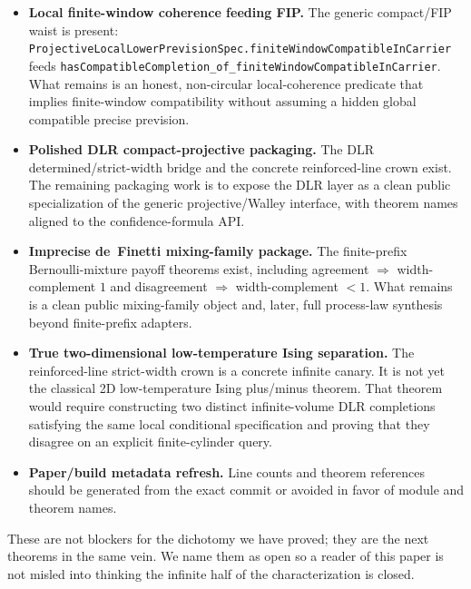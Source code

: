 \documentclass[]{article}
\newcommand{\lid}[1]{{\ttfamily\nolinkurl{#1}}}
\begin{document}
\begin{itemize}
\item \textbf{Local finite-window coherence feeding FIP.}
      The generic compact/FIP waist is present:
      \lid{ProjectiveLocalLowerPrevisionSpec.finiteWindowCompatibleInCarrier}
      feeds
      \lid{hasCompatibleCompletion\_of\_finiteWindowCompatibleInCarrier}.
      What remains is an honest, non-circular local-coherence predicate
      that implies finite-window compatibility without assuming a hidden
      global compatible precise prevision.

\item \textbf{Polished DLR compact-projective packaging.}
      The DLR determined/strict-width bridge and the concrete
      reinforced-line crown exist. The remaining packaging work is to
      expose the DLR layer as a clean public specialization of the generic
      projective/Walley interface, with theorem names aligned to the
      confidence-formula API.

\item \textbf{Imprecise de~Finetti mixing-family package.}
      The finite-prefix Bernoulli-mixture payoff theorems exist, including
      agreement $\Rightarrow$ width-complement $1$ and disagreement
      $\Rightarrow$ width-complement $<1$. What remains is a clean public
      mixing-family object and, later, full process-law synthesis beyond
      finite-prefix adapters.

\item \textbf{True two-dimensional low-temperature Ising separation.}
      The reinforced-line strict-width crown is a concrete infinite canary.
      It is not yet the classical 2D low-temperature Ising plus/minus
      theorem. That theorem would require constructing two distinct
      infinite-volume DLR completions satisfying the same local conditional
      specification and proving that they disagree on an explicit
      finite-cylinder query.

\item \textbf{Paper/build metadata refresh.}
      Line counts and theorem references should be generated from the exact
      commit or avoided in favor of module and theorem names.
\end{itemize}

These are not blockers for the dichotomy we have proved; they are
the next theorems in the same vein. We name them as open so a reader
of this paper is not misled into thinking the infinite half of the
characterization is closed.
\end{document}
